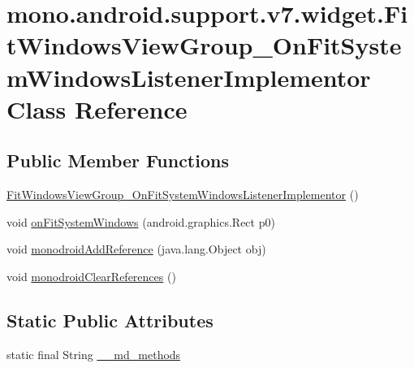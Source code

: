 \hypertarget{classmono_1_1android_1_1support_1_1v7_1_1widget_1_1_fit_windows_view_group___on_fit_system_windows_listener_implementor}{
\section{mono.android.support.v7.widget.FitWindowsViewGroup\_\-OnFitSystemWindowsListenerImplementor Class Reference}
\label{classmono_1_1android_1_1support_1_1v7_1_1widget_1_1_fit_windows_view_group___on_fit_system_windows_listener_implementor}
}
\subsection*{Public Member Functions}
\begin{CompactItemize}
\item 
\hyperlink{classmono_1_1android_1_1support_1_1v7_1_1widget_1_1_fit_windows_view_group___on_fit_system_windows_listener_implementor_c12810b955e54222393820eddae36c53}{FitWindowsViewGroup\_\-OnFitSystemWindowsListenerImplementor} ()
\item 
void \hyperlink{classmono_1_1android_1_1support_1_1v7_1_1widget_1_1_fit_windows_view_group___on_fit_system_windows_listener_implementor_3b95f689ada3045b02080434e45c441d}{onFitSystemWindows} (android.graphics.Rect p0)
\item 
void \hyperlink{classmono_1_1android_1_1support_1_1v7_1_1widget_1_1_fit_windows_view_group___on_fit_system_windows_listener_implementor_49c02a17d05a6addb6953936c6e5f3fd}{monodroidAddReference} (java.lang.Object obj)
\item 
void \hyperlink{classmono_1_1android_1_1support_1_1v7_1_1widget_1_1_fit_windows_view_group___on_fit_system_windows_listener_implementor_f38b0cdcff94bdbd0459c313770f3389}{monodroidClearReferences} ()
\end{CompactItemize}
\subsection*{Static Public Attributes}
\begin{CompactItemize}
\item 
static final String \hyperlink{classmono_1_1android_1_1support_1_1v7_1_1widget_1_1_fit_windows_view_group___on_fit_system_windows_listener_implementor_4bfebff3c5afa405dc21820881b44472}{\_\-\_\-md\_\-methods}
\end{CompactItemize}
